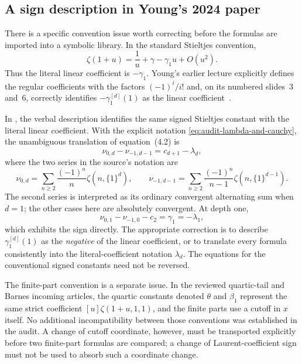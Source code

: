 \subsection{A sign description in Young's 2024 paper}

There is a specific convention issue worth correcting before the
formulas are imported into a symbolic library.  In the standard
Stieltjes convention,
\begin{equation}
 \zeta(1+u)=\frac1u+\gamma-\gamma_1u+O(u^2).
 \label{eq:audit-standard-stieltjes-sign}
\end{equation}
Thus the literal linear coefficient is $-\gamma_1$.
Young's earlier lecture explicitly defines the regular coefficients
with the factors $(-1)^i/i!$ and, on its numbered slides~3 and~6,
correctly identifies $-\gamma_1^{[d]}(1)$ as the linear
coefficient~\cite{YoungLecture}.

In \cite[equations~(4.1)--(4.2) and Corollary~3]{Young2024},
the verbal description identifies the same signed Stieltjes
constant with the literal linear coefficient.  With the explicit
notation \eqref{eq:audit-lambda-and-cauchy}, the unambiguous
translation of equation~(4.2) is
\begin{equation}
 \nu_{0,d}-\nu_{-1,d-1}=c_{d+1}-\lambda_d,
 \label{eq:audit-young-sign-translation}
\end{equation}
where the two series in the source's notation are
\begin{equation}
 \nu_{0,d}=\sum_{n\geq2}\frac{(-1)^n}{n}
                       \zeta(n,\{1\}^{d}),\qquad
 \nu_{-1,d-1}=\sum_{n\geq2}\frac{(-1)^n}{n-1}
                       \zeta(n,\{1\}^{d-1}).
 \label{eq:audit-young-nu-definition}
\end{equation}
The second series is interpreted as its ordinary convergent
alternating sum when $d=1$; the other cases here are absolutely
convergent.  At depth one,
\begin{equation}
 \nu_{0,1}-\nu_{-1,0}-c_2=\gamma_1=-\lambda_1,
 \label{eq:audit-depth-one-sign-control}
\end{equation}
which exhibits the sign directly.  The appropriate correction is
to describe $\gamma_1^{[d]}(1)$ as the \emph{negative} of the
linear coefficient, or to translate every formula consistently
into the literal-coefficient notation $\lambda_d$.  The equations
for the conventional signed constants need not be reversed.

The finite-part convention is a separate issue.  In the reviewed
quartic-tail and Barnes incoming articles, the quartic constants
denoted $\theta$ and $\beta_1$ represent the same strict coefficient
$[u]\zeta(1+u,1,1)$, and the finite parts use a cutoff in $x$
itself.  No additional incompatibility between those conventions
was established in the audit.  A change of cutoff coordinate,
however, must be transported explicitly before two finite-part
formulas are compared; a change of Laurent-coefficient sign must
not be used to absorb such a coordinate change.
